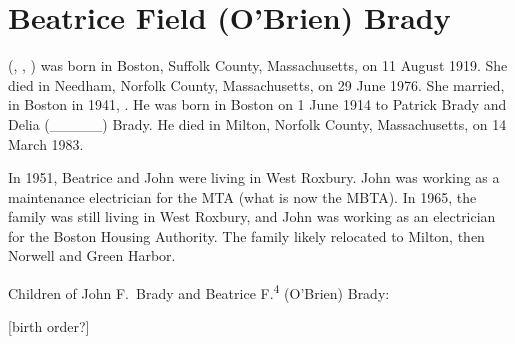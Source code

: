 \section{Beatrice Field (O'Brien) Brady}

 (, , ) was born in Boston, Suffolk County, Massachusetts, on 11 August 1919.\cite{Beatrice4OBrienBirth} She died in Needham, Norfolk County, Massachusetts, on 29 June 1976.\cite{Beatrice4OBrienDeath} She married, in Boston in 1941, .\cite{Beatrice4OBrienMarriage} He was born in Boston on 1 June 1914 to Patrick Brady and Delia (\_\_\_\_\_) Brady.\cite{JohnBradyDraft,Census1920JohnBrady} He died in Milton, Norfolk County, Massachusetts, on 14 March 1983.\cite{JohnBradyDeath}

In 1951, Beatrice and John were living in West Roxbury. John was working as a maintenance electrician for the MTA (what is now the MBTA).\cite{JohnBrady1951,HistoryoftheT} In 1965, the family was still living in West Roxbury, and John was working as an electrician for the Boston Housing Authority.\cite{JohnBrady1965} The family likely relocated to Milton, then Norwell and Green Harbor.\cite{Beatrice4OBrienObit}

\begin{KidsIntro}
	Children of John F.\ Brady and Beatrice F.\textsuperscript{4} (O'Brien) Brady:
\end{KidsIntro}

\begin{Kids}
	
	
	
\end{Kids}

[birth order?]
